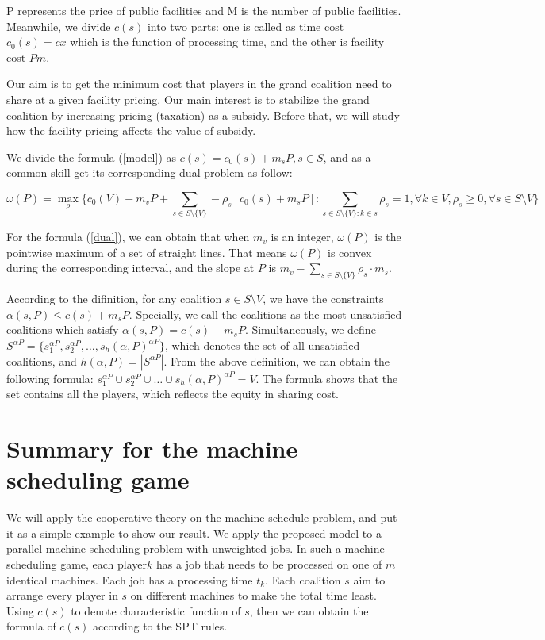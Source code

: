 \documentclass[UTF8]{article}
\begin{document}
P represents the price of public facilities and M is the number of public facilities. Meanwhile, we divide $c(s)$ into two parts: one is called as time cost $c_0(s) = cx$ which is the function of processing time, and the other is facility cost $Pm$.

Our aim is to get the minimum cost that players in the grand coalition need to share at a given facility pricing. Our main interest is to stabilize the grand coalition by increasing pricing (taxation) as a subsidy. Before that, we will study how the facility pricing affects the value of subsidy.

We divide the formula (\ref{model}) as $c(s)=c_0(s)+m_sP, s \in S$, and as a common skill get its corresponding dual problem as follow:

\begin{equation} \label{dual}
  \omega(P)=\mathop{\max}_{\rho}\{c_0(V)+m_vP+\sum_{s\in S\setminus\{V\}}-\rho_s[c_0(s)+m_sP]:\sum_{s\in S\setminus\{V\}:k\in s}\rho_s=1,\forall k \in V,\rho_s\geq 0,\forall s \in S \setminus{V}\}
\end{equation}

For the formula (\ref{dual}), we can obtain that when $m_v $ is an integer, $\omega(P)$ is the pointwise maximum of a set of straight lines. That means $\omega(P) $ is convex during the corresponding interval, and the slope at $P$ is $m_v-\sum_{s\in S \setminus\{V\}} \rho_s \cdot m_s$.

According to the difinition, for any coalition $s\in S\setminus{V}$, we have the constraints $\alpha(s,P)\leq c(s)+m_sP$. Specially, we call the coalitions as the most unsatisfied coalitions which satisfy $\alpha(s,P)=c(s)+m_sP$. Simultaneously, we define $S^{\alpha P}=\{s_1^{\alpha P},s_2^{\alpha P},\dots,s_h(\alpha,P)^{\alpha P}\}$, which denotes the set of all unsatisfied coalitions, and $h(\alpha,P)=|S^{\alpha P}|$. From the above definition, we can obtain the following formula: $s_1^{\alpha P}\cup s_2^{\alpha P}\cup\dots\cup s_h(\alpha,P)^{\alpha P}=V$.
The formula shows that the set contains all the players, which reflects the equity in sharing cost.




\section{Summary for the machine scheduling game}
We will apply the cooperative theory on the machine schedule problem, and put it as a simple example to show our result.
We apply the proposed model to a parallel machine scheduling problem with unweighted jobs.
In such a machine scheduling game, each player$k$ has a job that needs to be processed on one of $m$ identical machines. Each job has a processing time $t_k$. Each coalition $s$ aim to arrange every player in $s$ on different machines to make the total time least. Using $c(s)$ to denote characteristic function of $s$, then we can obtain the formula of $c(s)$ according to the SPT rules.
\end{document}
